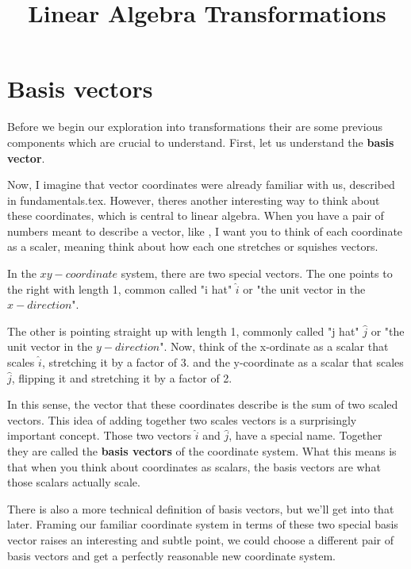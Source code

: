 \documentclass[12pt]{article}
\title{Linear Algebra Transformations}
\date{}
\begin{document}
    \maketitle

    \tableofcontents

\newpage

\section{Basis vectors}

Before we begin our exploration into transformations their are some previous components which are crucial to understand. First, let us understand the \textbf{basis vector}.

Now, I imagine that vector coordinates were already familiar with us, described in fundamentals.tex. However, theres another interesting way to think about these coordinates, which is central to linear algebra. When you have a pair of numbers meant to describe a vector, like , I want you to think of each coordinate as a scaler, meaning think about how each one stretches or squishes vectors.

In the $xy-coordinate$ system, there are two special vectors. The one points to the right with length 1, common called "i hat" $\hat{i}$ or "the unit vector in the $x-direction$".

The other is pointing straight up with length 1, commonly called "j hat" $\hat{j}$ or  "the unit vector in the $y-direction$". Now, think of the x-ordinate as a scalar that scales $\hat{i}$, stretching it by a factor of 3. and the y-coordinate as a scalar that scales $\hat{j}$, flipping it and stretching it by a factor of 2.


In this sense, the vector that these coordinates describe is the sum of two scaled vectors. This idea of adding together two scales vectors is a surprisingly important concept. Those two vectors $\hat{i}$ and $\hat{j}$, have a special name. Together they are called the \textbf{basis vectors} of the coordinate system. What this means is that when you think about coordinates as scalars, the basis vectors are what those scalars actually scale.


There is also a more technical definition of basis vectors, but we'll get into that later. Framing our familiar coordinate system in terms of these two special basis vector raises an interesting and subtle point, we could choose a different pair of basis vectors and get a perfectly reasonable new coordinate system.
\end{document}
